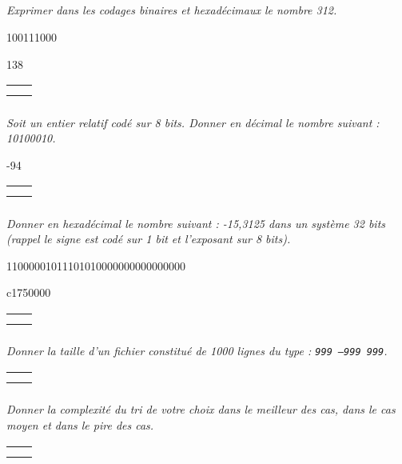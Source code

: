 \documentclass[10pt,fleqn]{article} %
\begin{document}

\vspace{2cm}
\pagestyle{fancy}
\thispagestyle{plain}

\subparagraph{}
\textit{Exprimer dans les codages binaires et hexadécimaux le nombre 312.}

\ifprof
\begin{corrige}
100111000

138
\end{corrige}
\else
\noindent\begin{tabular}{|p{\linewidth}|}
\hline
$$ \quad $$ \\
$$ \quad $$ \\
\hline
\end{tabular}
\fi
\subparagraph{}
\textit{Soit un entier relatif codé sur 8 bits. Donner en décimal le nombre suivant : 10100010.}

\ifprof
\begin{corrige}
-94
\end{corrige}
\else
\noindent\begin{tabular}{|p{\linewidth}|}
\hline
$$ \quad $$ \\
$$ \quad $$ \\
\hline
\end{tabular}
\fi

\subparagraph{}
\textit{Donner en hexadécimal le nombre suivant : -15,3125 dans un système 32 bits (rappel le signe est codé sur 1 bit et l'exposant sur 8 bits).}

\ifprof
\begin{corrige}
11000001011101010000000000000000

c1750000
\end{corrige}
\else
\noindent\begin{tabular}{|p{\linewidth}|}
\hline
$$ \quad $$ \\
$$ \quad $$ \\
\hline
\end{tabular}
\fi


\subparagraph{}
\textit{Donner la taille d'un fichier constitué de 1000 lignes du type : \texttt{999 --999 999}.}

\ifprof
\begin{corrige}

\end{corrige}
\else
\noindent\begin{tabular}{|p{\linewidth}|}
\hline
$$ \quad $$ \\
$$ \quad $$ \\
\hline
\end{tabular}
\fi

\subparagraph{}
\textit{Donner la complexité du tri de votre choix dans le meilleur des cas, dans le cas moyen et dans le pire des cas.}
\ifprof
\begin{corrige}

\end{corrige}
\else
\noindent\begin{tabular}{|p{\linewidth}|}
\hline
$$ \quad $$ \\
$$ \quad $$ \\
\hline
\end{tabular}
\fi
\end{document}
